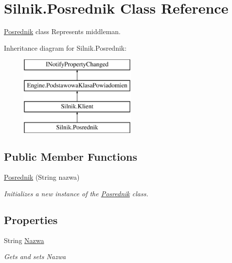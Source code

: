 \hypertarget{class_silnik_1_1_posrednik}{}\section{Silnik.\+Posrednik Class Reference}
\label{class_silnik_1_1_posrednik}


\mbox{\hyperlink{class_silnik_1_1_posrednik}{Posrednik}} class Represents middleman.  


Inheritance diagram for Silnik.\+Posrednik\+:\begin{figure}[H]
\begin{center}
\leavevmode
\includegraphics[height=4.000000cm]{class_silnik_1_1_posrednik}
\end{center}
\end{figure}
\subsection*{Public Member Functions}
\begin{DoxyCompactItemize}
\item 
\mbox{\hyperlink{class_silnik_1_1_posrednik_a55c7161a027803a4ca45a48466c13142}{Posrednik}} (String nazwa)
\begin{DoxyCompactList}\small\item\em Initializes a new instance of the \mbox{\hyperlink{class_silnik_1_1_posrednik}{Posrednik}} class. \end{DoxyCompactList}\end{DoxyCompactItemize}
\subsection*{Properties}
\begin{DoxyCompactItemize}
\item 
String \mbox{\hyperlink{class_silnik_1_1_posrednik_a2f7b267d89c092873db10e7928da53d7}{Nazwa}}
\begin{DoxyCompactList}\small\item\em Gets and sets Nazwa \end{DoxyCompactList}\end{DoxyCompactItemize}
